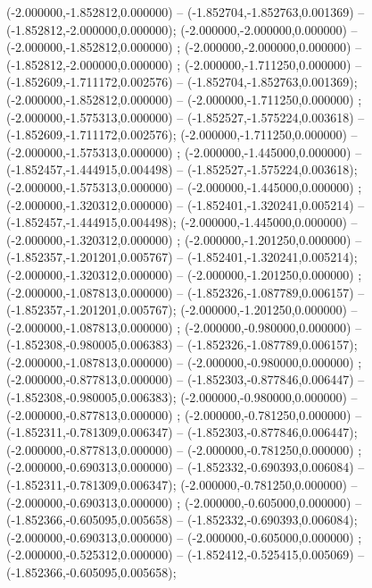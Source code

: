  (-2.000000,-1.852812,0.000000) -- (-1.852704,-1.852763,0.001369) -- (-1.852812,-2.000000,0.000000);
 (-2.000000,-2.000000,0.000000) -- (-2.000000,-1.852812,0.000000) ;
 (-2.000000,-2.000000,0.000000) -- (-1.852812,-2.000000,0.000000) ;
 (-2.000000,-1.711250,0.000000) -- (-1.852609,-1.711172,0.002576) -- (-1.852704,-1.852763,0.001369);
 (-2.000000,-1.852812,0.000000) -- (-2.000000,-1.711250,0.000000) ;
 (-2.000000,-1.575313,0.000000) -- (-1.852527,-1.575224,0.003618) -- (-1.852609,-1.711172,0.002576);
 (-2.000000,-1.711250,0.000000) -- (-2.000000,-1.575313,0.000000) ;
 (-2.000000,-1.445000,0.000000) -- (-1.852457,-1.444915,0.004498) -- (-1.852527,-1.575224,0.003618);
 (-2.000000,-1.575313,0.000000) -- (-2.000000,-1.445000,0.000000) ;
 (-2.000000,-1.320312,0.000000) -- (-1.852401,-1.320241,0.005214) -- (-1.852457,-1.444915,0.004498);
 (-2.000000,-1.445000,0.000000) -- (-2.000000,-1.320312,0.000000) ;
 (-2.000000,-1.201250,0.000000) -- (-1.852357,-1.201201,0.005767) -- (-1.852401,-1.320241,0.005214);
 (-2.000000,-1.320312,0.000000) -- (-2.000000,-1.201250,0.000000) ;
 (-2.000000,-1.087813,0.000000) -- (-1.852326,-1.087789,0.006157) -- (-1.852357,-1.201201,0.005767);
 (-2.000000,-1.201250,0.000000) -- (-2.000000,-1.087813,0.000000) ;
 (-2.000000,-0.980000,0.000000) -- (-1.852308,-0.980005,0.006383) -- (-1.852326,-1.087789,0.006157);
 (-2.000000,-1.087813,0.000000) -- (-2.000000,-0.980000,0.000000) ;
 (-2.000000,-0.877813,0.000000) -- (-1.852303,-0.877846,0.006447) -- (-1.852308,-0.980005,0.006383);
 (-2.000000,-0.980000,0.000000) -- (-2.000000,-0.877813,0.000000) ;
 (-2.000000,-0.781250,0.000000) -- (-1.852311,-0.781309,0.006347) -- (-1.852303,-0.877846,0.006447);
 (-2.000000,-0.877813,0.000000) -- (-2.000000,-0.781250,0.000000) ;
 (-2.000000,-0.690313,0.000000) -- (-1.852332,-0.690393,0.006084) -- (-1.852311,-0.781309,0.006347);
 (-2.000000,-0.781250,0.000000) -- (-2.000000,-0.690313,0.000000) ;
 (-2.000000,-0.605000,0.000000) -- (-1.852366,-0.605095,0.005658) -- (-1.852332,-0.690393,0.006084);
 (-2.000000,-0.690313,0.000000) -- (-2.000000,-0.605000,0.000000) ;
 (-2.000000,-0.525312,0.000000) -- (-1.852412,-0.525415,0.005069) -- (-1.852366,-0.605095,0.005658);
